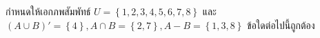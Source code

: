 ﻿%
\question กำหนดให้เอกภพสัมพัทธ์ $U=\left\{1,2,3,4,5,6,7,8\right\} $ และ $(A\cup B)'=\left\{4\right\}, A\cap B=\left\{2,7\right\}, A-B=\left\{1,3,8\right\} $ ข้อใดต่อไปนี้ถูกต้อง
\newline
{}
